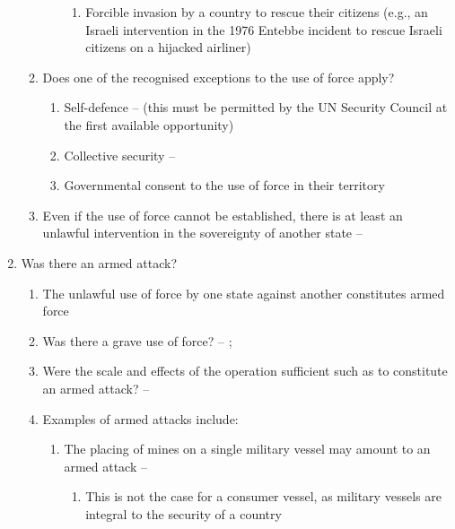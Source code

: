\begin{enumerate}
\begin{enumerate}
\begin{enumerate}
\begin{enumerate}
                \item Forcible invasion by a country to rescue their citizens (e.g., an Israeli intervention in the 1976 Entebbe incident to rescue Israeli citizens on a hijacked airliner)
            \end{enumerate}
        \end{enumerate}
        \item Does one of the recognised exceptions to the use of force apply?
        \begin{enumerate}
            \item Self-defence --  (this must be permitted by the UN Security Council at the first available opportunity)
            \item Collective security -- 
            \item Governmental consent to the use of force in their territory
        \end{enumerate}
        \item Even if the use of force cannot be established, there is at least an unlawful intervention in the sovereignty of another state -- 
    \end{enumerate}
    \item Was there an armed attack?
    \begin{enumerate}
        \item The unlawful use of force by one state against another constitutes armed force
        \item Was there a grave use of force? -- ; 
        \item Were the scale and effects of the operation sufficient such as to constitute an armed attack? -- 
        \item Examples of armed attacks include:
        \begin{enumerate}
            \item The placing of mines on a single military vessel may amount to an armed attack -- 
            \begin{enumerate}
                \item This is not the case for a consumer vessel, as military vessels are integral to the security of a country
            \end{enumerate}

\end{enumerate}
\end{enumerate}
\end{enumerate}
